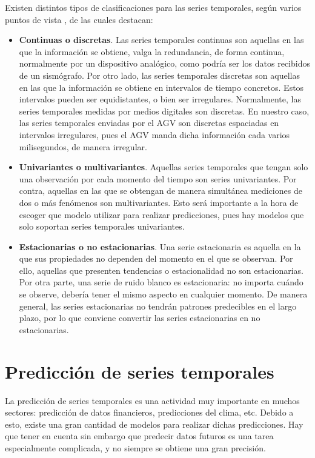 Existen distintos tipos de clasificaciones para las series temporales, según varios puntos de vista \cite{kitagawa2010introduction}, de
las cuales destacan:
\begin{itemize}
    \item \textbf{Continuas o discretas}. Las series temporales continuas son aquellas en las que la información se obtiene, valga la redundancia,
        de forma continua, normalmente por un dispositivo analógico, como podría ser los datos recibidos de un sismógrafo. Por otro lado,
        las series temporales discretas son aquellas en las que la información se obtiene en intervalos de tiempo concretos. Estos intervalos 
        pueden ser equidistantes, o bien ser irregulares. Normalmente, las series temporales medidas por medios digitales son discretas.
        En nuestro caso, las series temporales enviadas por el AGV son discretas espaciadas en intervalos irregulares, pues el AGV manda dicha
        información cada varios milisegundos, de manera irregular.
    \item \textbf{Univariantes o multivariantes}. Aquellas series temporales que tengan solo una observación por cada momento del tiempo son series
        univariantes. Por contra, aquellas en las que se obtengan de manera simultánea mediciones de dos o más fenómenos son multivariantes.
        Esto será importante a la hora de escoger que modelo utilizar para realizar predicciones, pues hay modelos que solo soportan series
        temporales univariantes.
    \item \textbf{Estacionarias o no estacionarias}. Una serie estacionaria \cite{hyndman2018forecasting} es aquella en la que sus propiedades no dependen del momento
        en el que se observan. Por ello, aquellas que presenten tendencias o estacionalidad no son estacionarias. Por otra parte, una serie de 
        ruido blanco es estacionaria: no importa cuándo se observe, debería tener el mismo aspecto en cualquier momento. De manera general, las
        series estacionarias no tendrán patrones predecibles en el largo plazo, por lo que conviene convertir las series estacionarias en no
        estacionarias.
\end{itemize}

\section{Predicción de series temporales}

La predicción de series temporales es una actividad muy importante en muchos sectores: predicción 
de datos financieros, predicciones del clima, etc. Debido a esto, existe una gran cantidad de 
modelos para realizar dichas predicciones. Hay que tener en cuenta sin embargo que predecir 
datos futuros es una tarea especialmente complicada, y no siempre se obtiene una gran precisión.

